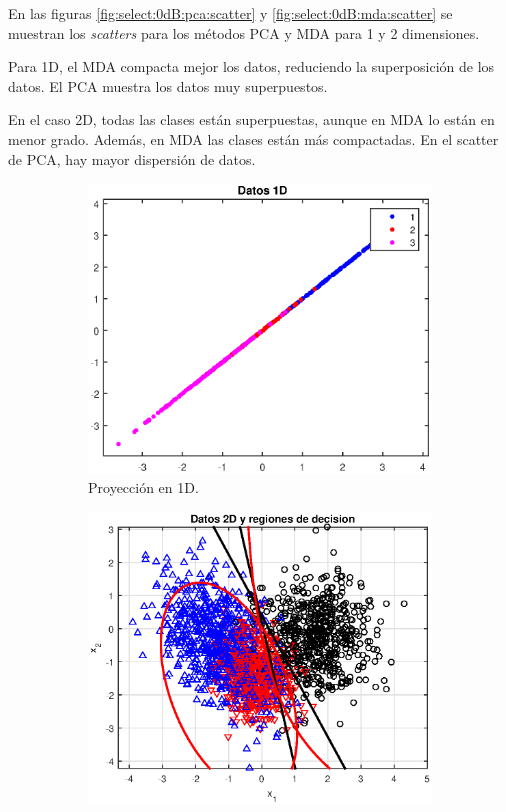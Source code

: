 \documentclass[11pt]{article} %
\begin{document}
En las figuras \ref{fig:select:0dB:pca:scatter} y \ref{fig:select:0dB:mda:scatter} se muestran los \emph{scatters} para los métodos PCA y MDA para 1 y 2 dimensiones.

Para 1D, el MDA compacta mejor los datos, reduciendo la superposición de los datos. El PCA muestra los datos muy superpuestos.

En el caso 2D, todas las clases están superpuestas, aunque en MDA lo están en menor grado. Además, en MDA las clases están más compactadas. En el scatter de PCA, hay mayor dispersión de datos.

\begin{figure}[h]
	\centering
	\begin{subfigure}[b]{0.435\textwidth}
		\includegraphics[width=\textwidth]{../21_seleccion/3_pca_0dB_1d.eps}
		\caption[]{\small Proyección en 1D.}
		\label{fig:select:0dB:pca:scatter:1D}
	\end{subfigure}
	\quad
	\begin{subfigure}[b]{0.435\textwidth}
		\includegraphics[width=\textwidth]{../21_seleccion/3_pca_0dB_2d.eps}

\end{subfigure}
\end{figure}
\end{document}
